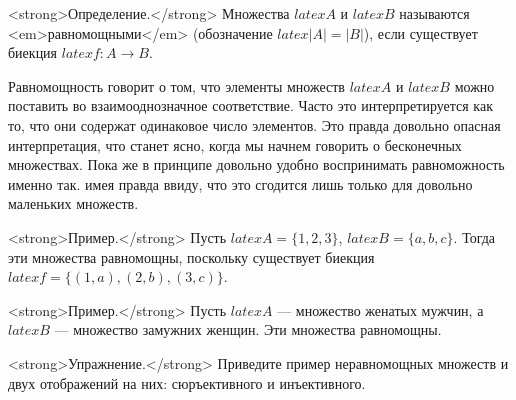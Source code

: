 <strong>Определение.</strong> Множества $latex A$ и $latex B$ называются <em>равномощными</em> (обозначение $latex |A| = |B|$), если существует биекция $latex f: A\to B$.

Равномощность говорит о том, что элементы множеств $latex A$ и $latex B$ можно поставить во взаимооднозначное соответствие. Часто это интерпретируется как то, что они содержат одинаковое число элементов. Это правда довольно опасная интерпретация, что станет ясно, когда мы начнем говорить о бесконечных множествах. Пока же в принципе довольно удобно воспринимать равноможность именно так. имея  правда ввиду, что это сгодится лишь только для довольно маленьких множеств.

<strong>Пример.</strong> Пусть $latex A = \{1, 2, 3\}$, $latex B = \{a, b, c\}$. Тогда эти множества равномощны, поскольку существует биекция $latex f=\{(1, a), (2, b) , (3, c)\}$.

<strong>Пример.</strong> Пусть $latex A$ — множество женатых мужчин, а $latex B$ — множество замужних женщин. Эти множества равномощны.

<strong>Упражнение.</strong> Приведите пример неравномощных множеств и двух отображений на них: сюръективного и инъективного.
